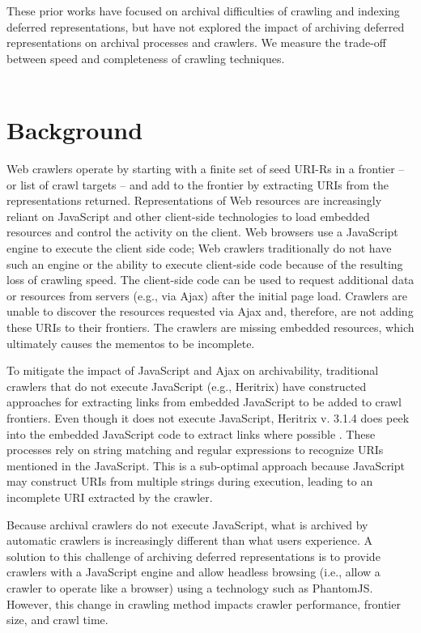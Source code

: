 \documentclass{ipres_proc_article-sp}
\begin{document}
These prior works have focused on archival difficulties of crawling and indexing deferred representations, but have not explored the impact of archiving deferred representations on archival processes and crawlers. We measure the trade-off between speed and completeness of crawling techniques.
\\
\\
\section{Background}
\label{backgroung}
Web crawlers operate by starting with a finite set of seed URI-Rs in a frontier -- or list of crawl targets -- and add to the frontier by extracting URIs from the representations returned. 
Representations of Web resources are increasingly reliant on JavaScript and other client-side technologies to load embedded resources and control the activity on the client. Web browsers use a JavaScript engine to execute the client side code; Web crawlers traditionally do not have such an engine or the ability to execute client-side code because of the resulting loss of crawling speed. The client-side code can be used to request additional data or resources from servers (e.g., via Ajax) after the initial page load. Crawlers are unable to discover the resources requested via Ajax and, therefore, are not adding these URIs to their frontiers. The crawlers are missing embedded resources, which ultimately causes the mementos to be incomplete. 

To mitigate the impact of JavaScript and Ajax on archivability, traditional crawlers that do not execute JavaScript (e.g., Heritrix) have constructed approaches for extracting links from embedded JavaScript to be added to crawl frontiers. Even though it does not execute JavaScript, Heritrix v. 3.1.4 does peek into the embedded JavaScript code to extract links where possible \cite{htrixJS}. These processes rely on string matching and regular expressions to recognize URIs mentioned in the JavaScript. This is a sub-optimal approach because JavaScript may construct URIs from multiple strings during execution, leading to an incomplete URI extracted by the crawler.  

Because archival crawlers do not execute JavaScript, what is archived by automatic crawlers is increasingly different than what users experience. A solution to this challenge of archiving deferred representations is to provide crawlers with a JavaScript engine and allow headless browsing (i.e., allow a crawler to operate like a browser) using a technology such as PhantomJS. However, this change in crawling method impacts crawler performance, frontier size, and crawl time.
\end{document}

